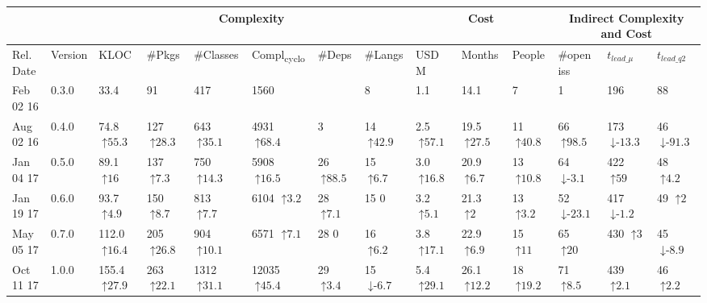 \begin{tabular}{ll|llllll|lll|lll}
\toprule
\multicolumn{2}{c|}{} & \multicolumn{6}{c|}{Complexity} & \multicolumn{3}{c|}{Cost} & \multicolumn{3}{c}{Indirect Complexity and Cost}\\
\midrule
Rel. Date & Version & KLOC & \#Pkgs & \#Classes & Compl\textsubscript{cyclo} & \#Deps & \#Langs & USD M & Months & People & \#open iss & $t_{lead\_\mu}$ & $t_{lead\_q2}$ \\
\midrule
Feb 02 16 & 0.3.0 & 33.4    & 91    & 417    & 1560    &     & 8    & 1.1    & 14.1    & 7    & 1    & 196    & 88    \\
Aug 02 16 & 0.4.0 & 74.8 {\tiny $\uparrow\text{55.3}$} & 127 {\tiny $\uparrow\text{28.3}$} & 643 {\tiny $\uparrow\text{35.1}$} & 4931 {\tiny $\uparrow\text{68.4}$} & 3    & 14 {\tiny $\uparrow\text{42.9}$} & 2.5 {\tiny $\uparrow\text{57.1}$} & 19.5 {\tiny $\uparrow\text{27.5}$} & 11 {\tiny $\uparrow\text{40.8}$} & 66 {\tiny $\uparrow\text{98.5}$} & 173 {\tiny $\downarrow\text{-}\text{13.3}$} & 46 {\tiny $\downarrow\text{-}\text{91.3}$} \\
Jan 04 17 & 0.5.0 & 89.1 {\tiny $\uparrow\text{16}$} & 137 {\tiny $\uparrow\text{7.3}$} & 750 {\tiny $\uparrow\text{14.3}$} & 5908 {\tiny $\uparrow\text{16.5}$} & 26 {\tiny $\uparrow\text{88.5}$} & 15 {\tiny $\uparrow\text{6.7}$} & 3.0 {\tiny $\uparrow\text{16.8}$} & 20.9 {\tiny $\uparrow\text{6.7}$} & 13 {\tiny $\uparrow\text{10.8}$} & 64 {\tiny $\downarrow\text{-}\text{3.1}$} & 422 {\tiny $\uparrow\text{59}$} & 48 {\tiny $\uparrow\text{4.2}$} \\
Jan 19 17 & 0.6.0 & 93.7 {\tiny $\uparrow\text{4.9}$} & 150 {\tiny $\uparrow\text{8.7}$} & 813 {\tiny $\uparrow\text{7.7}$} & 6104 {\tiny $\uparrow\text{3.2}$} & 28 {\tiny $\uparrow\text{7.1}$} & 15 {\tiny $\text{0}$} & 3.2 {\tiny $\uparrow\text{5.1}$} & 21.3 {\tiny $\uparrow\text{2}$} & 13 {\tiny $\uparrow\text{3.2}$} & 52 {\tiny $\downarrow\text{-}\text{23.1}$} & 417 {\tiny $\downarrow\text{-}\text{1.2}$} & 49 {\tiny $\uparrow\text{2}$} \\
May 05 17 & 0.7.0 & 112.0 {\tiny $\uparrow\text{16.4}$} & 205 {\tiny $\uparrow\text{26.8}$} & 904 {\tiny $\uparrow\text{10.1}$} & 6571 {\tiny $\uparrow\text{7.1}$} & 28 {\tiny $\text{0}$} & 16 {\tiny $\uparrow\text{6.2}$} & 3.8 {\tiny $\uparrow\text{17.1}$} & 22.9 {\tiny $\uparrow\text{6.9}$} & 15 {\tiny $\uparrow\text{11}$} & 65 {\tiny $\uparrow\text{20}$} & 430 {\tiny $\uparrow\text{3}$} & 45 {\tiny $\downarrow\text{-}\text{8.9}$} \\
Oct 11 17 & 1.0.0 & 155.4 {\tiny $\uparrow\text{27.9}$} & 263 {\tiny $\uparrow\text{22.1}$} & 1312 {\tiny $\uparrow\text{31.1}$} & 12035 {\tiny $\uparrow\text{45.4}$} & 29 {\tiny $\uparrow\text{3.4}$} & 15 {\tiny $\downarrow\text{-}\text{6.7}$} & 5.4 {\tiny $\uparrow\text{29.1}$} & 26.1 {\tiny $\uparrow\text{12.2}$} & 18 {\tiny $\uparrow\text{19.2}$} & 71 {\tiny $\uparrow\text{8.5}$} & 439 {\tiny $\uparrow\text{2.1}$} & 46 {\tiny $\uparrow\text{2.2}$} \\

\end{tabular}
